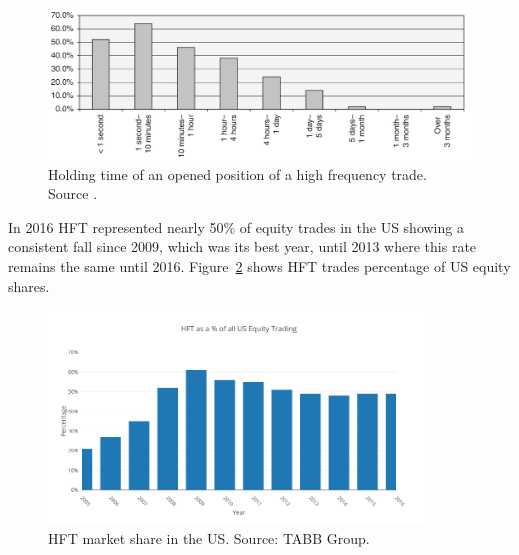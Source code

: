 \begin{figure}[!h]
  \centering
  \includegraphics[width=\textwidth]{img/HFTtradestime}
  \caption[Holding time of an opened position of a high frequency trade]{Holding time of an opened position of a high frequency trade. Source
  \cite{aldridge2009}.}
  \label{fig:HFTtimes}
\end{figure}
In 2016 HFT represented nearly 50\% of equity trades in the US showing a consistent fall since 2009, which was its best year, until 2013 where this rate remains the same until 2016.  Figure~\ref{fig:HFTmarket1} shows HFT trades percentage of US equity shares.  

\begin{figure}[!h]
  \centering
  \includegraphics[width=0.9\textwidth]{img/HFTmarket1.png}
  \caption[HFT market share in the US and Europe]{HFT market share in the US. Source: TABB Group.}
  \label{fig:HFTmarket1}
\end{figure}

